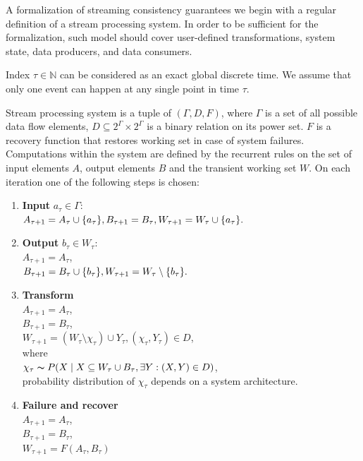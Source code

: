 A formalization of streaming consistency guarantees we begin with a regular definition of a stream processing system. In order to be sufficient for the formalization, such model should cover user-defined transformations, system state, data producers, and data consumers.

Index $\tau\in{\mathbb{N}}$ can be considered as an exact global discrete time. We assume that only one event can happen at any single point in time $\tau$.

\begin{definition}{Stream processing system}
\label{reference_system}
is a tuple of $(\Gamma,D,F)$, where $\Gamma$ is a set of all possible data flow elements, $D\subseteq{2^{\Gamma}\times2^{\Gamma}}$ is a binary relation on its power set. $F$ is a recovery function that restores working set in case of system failures. Computations within the system are defined by the recurrent rules on the set of input elements $A$, output elements $B$ and the transient working set $W$. On each iteration one of the following steps is chosen:

\begin{enumerate}
    \item \textbf{Input} $a_\tau\in{\Gamma}$:\\ $A_{\tau+1}=A_\tau \cup \{a_\tau\}, \\ B_{\tau+1}=B_{\tau}, \\ W_{\tau+1}=W_{\tau} \cup \{a_\tau\}.$
    \item \textbf{Output} $b_\tau\in{W_\tau}$:\\ $A_{\tau + 1} = A_{\tau}$, \\ $B_{\tau+1}=B_\tau \cup \{b_\tau\}, \\ W_{\tau+1}=W_{\tau} \setminus \{b_\tau\}.$
    \item \textbf{Transform}\\ $A_{\tau + 1} = A_{\tau}$,\\ $B_{\tau+1}=B_{\tau}$, \\ $W_{\tau+1}=(W_\tau \setminus \chi_\tau) \cup Y_\tau, (\chi_\tau,Y_\tau) \in D$, \\where\\$\chi_\tau \thicksim P(X\mid X \subseteq W_\tau \cup B_\tau , \exists Y : (X,Y) \in D)$, \\ probability distribution of $\chi_\tau$ depends on a system architecture. \label{random_formula}
    \item \textbf{Failure and recover} \\  $A_{\tau + 1} = A_{\tau}$,\\ $B_{\tau+1}=B_{\tau}$, \\ $W_{\tau+1} = F(A_\tau,B_\tau)$
\end{enumerate}

\end{definition}

